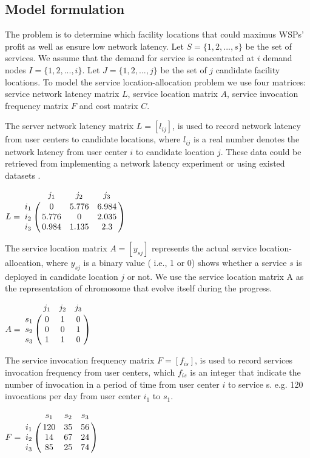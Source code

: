 \documentclass[twoside]{article}
\let\bbordermatrix\bordermatrix
\begin{document}
\subsection{Model formulation}
The problem is to determine which facility locations that could maximus WSPs’ profit 
as well as ensure low network latency. 
Let $S = \{ 1, 2, ..., s\}$ be the set of services. We assume that the demand for service is concentrated at $i$ 
demand nodes $I = \{ 1, 2, ..., i \}$. Let $J = \{ 1, 2, ..., j \}$ be the set of $j$ candidate facility locations.
To model the service location-allocation problem we use four matrices: service network latency matrix $L$, service location
matrix $A$, service invocation frequency matrix $F$ and cost matrix $C$.

The server network latency matrix $L = [l_{ij}]$, is used to record network latency from user centers to 
candidate locations, where $l_{ij}$ is a real number denotes the network latency from user center $i$ to candidate 
location $j$. 
These data could be retrieved from implementing a network latency experiment or using existed datasets \cite{5552800, 6076756}.
\begin{center}
$
L = \bbordermatrix{~ & j_{1} & j_{2} & j_{3} \cr
					i_{1}	&0 &5.776 &6.984	\cr
					i_{2}	&5.776  &0 &2.035 \cr
					i_{3}	&0.984 &1.135	&2.3 \cr} 
$
\end{center}
The service location matrix $A = [y_{sj}]$ represents the actual service location-allocation, where $y_{sj}$  is a binary value ( i.e., 1 or 0) shows whether a service $s$ is deployed in candidate location $j$ or not.
We use the service location matrix A as the representation of chromosome that evolve itself during the progress.
\begin{center}
$
A = \bbordermatrix{~ & j_{1} & j_{2} & j_{3}\cr
					s_{1}	&0 &1 &0	\cr
					s_{2}	&0  &0 &1	\cr
					s_{3}	&1 &1 &0	\cr} 
$
\end{center}

The service invocation frequency matrix $F= [f_{is}]$, is used to record services invocation frequency from user centers, which $f_{is}$ is an integer that indicate the number of invocation in a period of time from user center $i$ to service s. e.g. 120 invocations per day from user center $i_{1}$ to $s_{1}$.
\begin{center}
$
F = \bbordermatrix{~ & s_{1} & s_{2} & s_{3}  \cr
					i_{1}	&120 &35 &56	\cr
					i_{2}	&14  &67 &24 \cr
					i_{3}	&85 &25 &74 \cr} 
$
\end{center}
\end{document}

